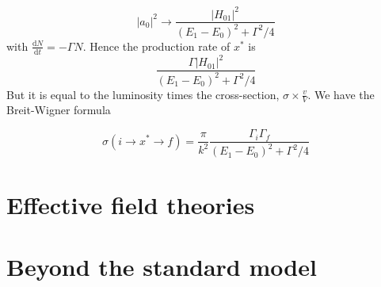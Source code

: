 \documentclass[a4paper]{book}
\theoremstyle{definition}
\theoremstyle{remark}
\begin{document}
\begin{equation}
    |a_0|^2 \rightarrow \frac{|H_{01}|^2}{(E_1-E_0)^2 + \Gamma^2/4}
\end{equation}
with $\frac{\text{d}N}{\text{d}t } = -\Gamma N$. Hence the production rate of $x^*$ is \begin{equation}
    \frac{\Gamma|H_{01}|^2}{(E_1-E_0)^2 + \Gamma^2/4}
\end{equation}
But it is equal to the luminosity times the cross-section, $\sigma \times \frac{v}{V}$. We have the Breit-Wigner formula

\begin{equation}
\sigma(i\rightarrow x^* \rightarrow f) = \frac{\pi}{k^2}\frac{\Gamma_i \Gamma_f}{(E_1 - E_0)^2 + \Gamma^2/4}    
\end{equation}



\chapter{Effective field theories}

\chapter{Beyond the standard model}
\end{document}
